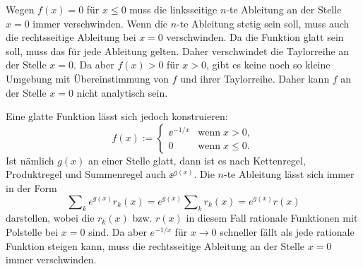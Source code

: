 \begin{Beweis}
Wegen $f(x)=0$ für $x\le 0$ muss die linksseitige $n$-te Ableitung
an der Stelle $x=0$ immer verschwinden. Wenn die $n$-te Ableitung
stetig sein soll, muss auch die rechtsseitige Ableitung bei $x=0$
verschwinden. Da die Funktion glatt sein soll, muss das für jede
Ableitung gelten. Daher verschwindet die Taylorreihe an der Stelle
$x=0$. Da aber $f(x)>0$ für $x>0$, gibt es keine noch so kleine
Umgebung mit Übereinstimmung von $f$ und ihrer Taylorreihe.
Daher kann $f$ an der Stelle $x=0$ nicht analytisch sein.

Eine glatte Funktion lässt sich jedoch konstruieren:
\[f(x):=\begin{cases}
\ee^{-1/x}&\text{wenn}\;x>0,\\
0&\text{wenn}\;x\le 0.
\end{cases}\]
Ist nämlich $g(x)$ an einer Stelle glatt, dann ist
es nach Kettenregel, Produktregel und Summenregel auch $\ee^{g(x)}$.
Die $n$-te Ableitung lässt sich immer in der Form%
\[\sum\nolimits_k e^{g(x)}{r_k(x)}
= e^{g(x)}\sum\nolimits_k r_k(x) = e^{g(x)}r(x)\]
darstellen, wobei die $r_k(x)$ bzw. $r(x)$ in diesem Fall rationale
Funktionen mit Polstelle bei $x=0$ sind. Da aber $e^{-1/x}$ für
$x\to 0$ schneller fällt als jede rationale Funktion steigen kann,
muss die rechtsseitige Ableitung an der Stelle $x=0$ immer
verschwinden.\;\qedsymbol
\end{Beweis}

